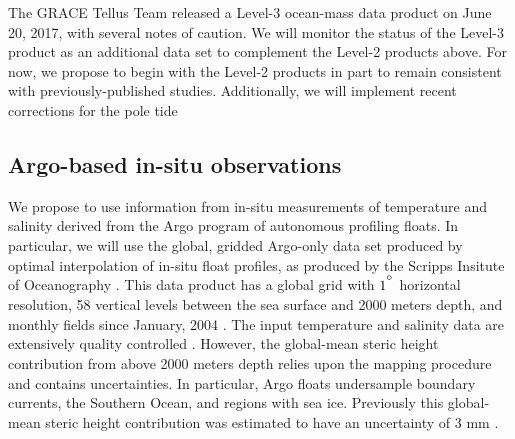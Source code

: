 \documentclass[authoryear,round,12pt]{article}
\def\degree{\hbox{$^\circ$}}
\begin{document}
The GRACE Tellus Team released a Level-3 ocean-mass data product on June 20, 2017, with several notes of caution. We will monitor the status of the Level-3 product as an additional data set to complement the Level-2 products above. For now, we propose to begin with the Level-2 products in part to remain consistent with previously-published studies. Additionally, we will implement recent corrections for the pole tide \citep{Wahr-Nerem-2015:pole}



\subsection{Argo-based in-situ observations}


We propose to use information from in-situ measurements of temperature and salinity derived from the Argo program of autonomous profiling floats. In particular, we will use the global, gridded Argo-only data set produced by optimal interpolation of in-situ float profiles, as produced by the Scripps Insitute of Oceanography  \citep[available at ][]{Argo--2019:Argo}. This data product has a global grid with $1^{\degree}$ horizontal resolution, 58 vertical levels between the sea surface and 2000 meters depth, and monthly fields since January, 2004 \citep{Roemmich-Gilson-2009:2004}. 
The input temperature and salinity data are extensively quality controlled \citep{Wong-Keeley-2009:Argo}. However, the global-mean steric height contribution from above 2000 meters depth relies upon the mapping procedure and contains uncertainties. In particular, Argo floats undersample boundary currents, the Southern Ocean, and regions with sea ice. Previously this global-mean steric height contribution was estimated to have an uncertainty of 3 mm \citep{Willis-Chambers-2008:Assessing}.
\end{document}
